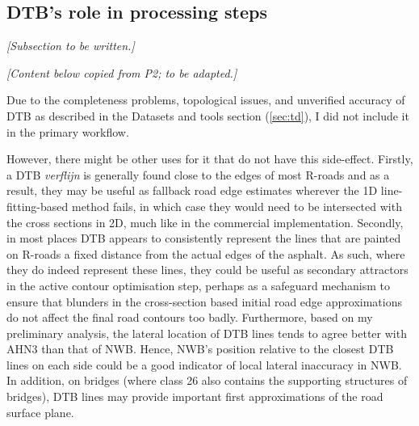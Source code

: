 \subsection{DTB's role in processing steps}
\label{sub:dtbrole}

\textit{[Subsection to be written.]}

\textit{[Content below copied from P2; to be adapted.]}

Due to the completeness problems, topological issues, and unverified accuracy of DTB as described in the Datasets and tools section (\ref{sec:td}), I did not include it in the primary workflow.

However, there might be other uses for it that do not have this side-effect. Firstly, a DTB \textit{verflijn} is generally found close to the edges of most R-roads and as a result, they may be useful as fallback road edge estimates wherever the 1D line-fitting-based method fails, in which case they would need to be intersected with the cross sections in 2D, much like in the commercial implementation. Secondly, in most places DTB appears to consistently represent the lines that are painted on R-roads a fixed distance from the actual edges of the asphalt. As such, where they do indeed represent these lines, they could be useful as secondary attractors in the active contour optimisation step, perhaps as a safeguard mechanism to ensure that blunders in the cross-section based initial road edge approximations do not affect the final road contours too badly. Furthermore, based on my preliminary analysis, the lateral location of DTB lines tends to agree better with AHN3 than that of NWB. Hence, NWB’s position relative to the closest DTB lines on each side could be a good indicator of local lateral inaccuracy in NWB. In addition, on bridges (where class 26 also contains the supporting structures of bridges), DTB lines may provide important first approximations of the road surface plane.

